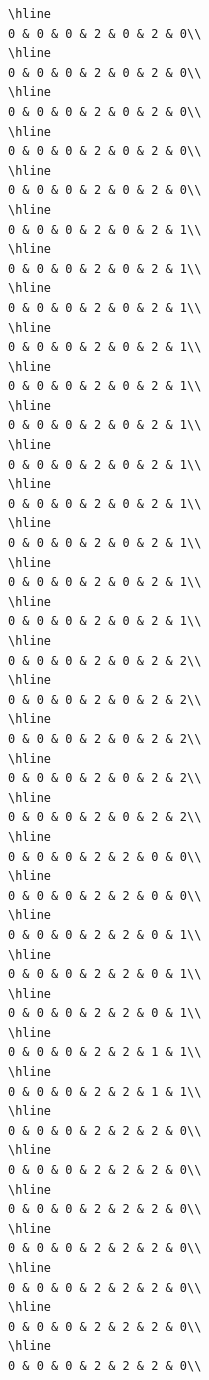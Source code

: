 \documentclass[
]{article}
\begin{document}
\begin{verbatim}
\hline
0 & 0 & 0 & 2 & 0 & 2 & 0\\
\hline
0 & 0 & 0 & 2 & 0 & 2 & 0\\
\hline
0 & 0 & 0 & 2 & 0 & 2 & 0\\
\hline
0 & 0 & 0 & 2 & 0 & 2 & 0\\
\hline
0 & 0 & 0 & 2 & 0 & 2 & 0\\
\hline
0 & 0 & 0 & 2 & 0 & 2 & 1\\
\hline
0 & 0 & 0 & 2 & 0 & 2 & 1\\
\hline
0 & 0 & 0 & 2 & 0 & 2 & 1\\
\hline
0 & 0 & 0 & 2 & 0 & 2 & 1\\
\hline
0 & 0 & 0 & 2 & 0 & 2 & 1\\
\hline
0 & 0 & 0 & 2 & 0 & 2 & 1\\
\hline
0 & 0 & 0 & 2 & 0 & 2 & 1\\
\hline
0 & 0 & 0 & 2 & 0 & 2 & 1\\
\hline
0 & 0 & 0 & 2 & 0 & 2 & 1\\
\hline
0 & 0 & 0 & 2 & 0 & 2 & 1\\
\hline
0 & 0 & 0 & 2 & 0 & 2 & 1\\
\hline
0 & 0 & 0 & 2 & 0 & 2 & 2\\
\hline
0 & 0 & 0 & 2 & 0 & 2 & 2\\
\hline
0 & 0 & 0 & 2 & 0 & 2 & 2\\
\hline
0 & 0 & 0 & 2 & 0 & 2 & 2\\
\hline
0 & 0 & 0 & 2 & 0 & 2 & 2\\
\hline
0 & 0 & 0 & 2 & 2 & 0 & 0\\
\hline
0 & 0 & 0 & 2 & 2 & 0 & 0\\
\hline
0 & 0 & 0 & 2 & 2 & 0 & 1\\
\hline
0 & 0 & 0 & 2 & 2 & 0 & 1\\
\hline
0 & 0 & 0 & 2 & 2 & 0 & 1\\
\hline
0 & 0 & 0 & 2 & 2 & 1 & 1\\
\hline
0 & 0 & 0 & 2 & 2 & 1 & 1\\
\hline
0 & 0 & 0 & 2 & 2 & 2 & 0\\
\hline
0 & 0 & 0 & 2 & 2 & 2 & 0\\
\hline
0 & 0 & 0 & 2 & 2 & 2 & 0\\
\hline
0 & 0 & 0 & 2 & 2 & 2 & 0\\
\hline
0 & 0 & 0 & 2 & 2 & 2 & 0\\
\hline
0 & 0 & 0 & 2 & 2 & 2 & 0\\
\hline
0 & 0 & 0 & 2 & 2 & 2 & 0\\

\end{verbatim}
\end{document}
